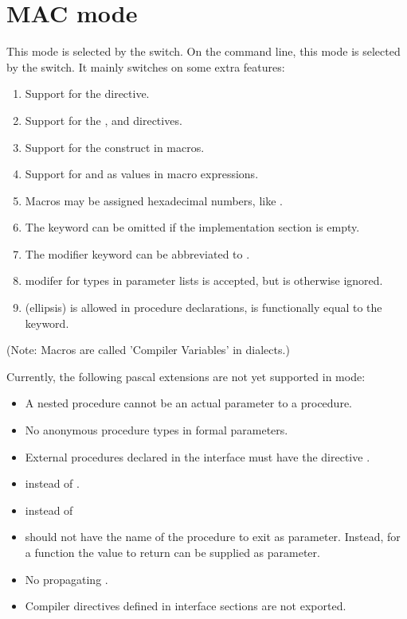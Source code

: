\section{MAC mode}
This mode is selected by the  switch. On the
command line, this mode is selected by the  switch. It mainly
switches on some extra features:
\begin{enumerate}
\item Support for the  directive.
\item Support for the ,  and 
directives.
\item Support for the  construct in macros.
\item Support for  and  as values in macro expressions.
\item Macros may be assigned hexadecimal numbers, like .
\item The  keyword can be omitted if the implementation
section is empty.
\item The  modifier keyword can be abbreviated to .
\item {} modifer for types in parameter lists is accepted, but is
otherwise ignored.
\item {} (ellipsis) is allowed in procedure declarations, is
functionally equal to the  keyword.
\end{enumerate}
(Note: Macros are called 'Compiler Variables' in \macos dialects.)

Currently, the following \macos pascal extensions are not yet supported in
 mode:
\begin{itemize}
\item A nested procedure cannot be an actual parameter to a procedure. 
\item No anonymous procedure types in formal parameters. 
\item External procedures declared in the interface must have the directive . 
\item {} instead of .
\item {} instead of 
\item {} should not have the name of the procedure to exit as parameter.
Instead, for a function the value to return can be supplied as parameter. 
\item No propagating .
\item Compiler directives defined in interface sections are not exported.
\end{itemize}

